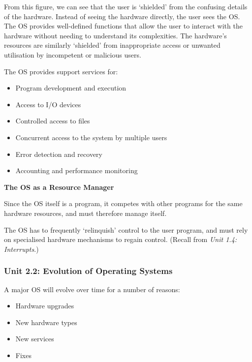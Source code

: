 \documentclass{article}
\begin{document}
From this figure, we can see that the user is `shielded' from the confusing details of the hardware.
Instead of seeing the hardware directly, the user sees the OS. The OS provides well-defined functions that allow the user to interact with the hardware without 
needing to understand its complexities. The hardware's resources are similarly `shielded' from inappropriate access or unwanted utilisation by 
incompetent or malicious users.

The OS provides support services for:
\begin{itemize}
    \item Program development and execution
    \item Access to I/O devices
    \item Controlled access to files
    \item Concurrent access to the system by multiple users
    \item Error detection and recovery
    \item Accounting and performance monitoring
\end{itemize}

\textbf{The OS as a Resource Manager}

Since the OS itself is a program, it competes with other programs for the same hardware resources, and must
therefore manage itself.

The OS has to frequently `relinquish' control to the user program, and must rely on specialised hardware mechanisms
to regain control. (Recall from \textit{Unit 1.4: Interrupts}.)

\subsubsection*{Unit 2.2: Evolution of Operating Systems}
{}

A major OS will evolve over time for a number of reasons:
\begin{itemize}
    \item Hardware upgrades
    \item New hardware types
    \item New services
    \item Fixes
\end{itemize}
\end{document}
